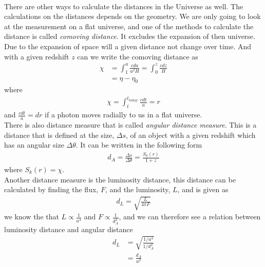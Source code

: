 \documentclass{aa}
\begin{document}
\\
There are other ways to calculate the distances in the Universe as well. The calculations on the distances depends on the geometry.
 We are only going to look at the measurement on a flat universe, and one of the methods to calculate the distance is called \emph{comoving distance}. It excludes the expansion of then universe. Due to the expansion of space will a given distance not change over time. And with a given redshift $z$ can we write the comoving distance as
\begin{align}
    \chi &=\int_1^a\frac{cda}{a^2H}=\int_0^z\frac{cdz}{H}\\
    &=\eta-\eta_0
\end{align}
where
\begin{align}
    \chi=\int_t^{t_\text{today}}\frac{cdt}{a}=r
\end{align}
and $\frac{cdt}{a}=dr$ if a photon moves radially to us in a flat universe.
\\
There is also distance measure that is called \emph{angular distance measure}. This is a distance that is defined at the size, $\Delta s$, of an object with a given redshift which has an angular size $\Delta \theta$. It can be written in the following form
\begin{align}
    d_A=\frac{\Delta s}{\Delta \theta}=\frac{S_k(r)}{1+z}
\end{align}
where $S_k(r)=\chi$.\\
Another distance measure is the luminosity distance, this distance can be calculated by finding the flux, $F$, and the luminosity, $L$, and is given as
\begin{align}
    d_L=\sqrt{\frac{L}{4\pi F}}
\end{align}
we know the that $L\propto \frac{1}{a^4}$ and $F\propto\frac{1}{d_A^2}$, and we can therefore see a relation between luminosity distance and angular distance 
\begin{align}
    d_L&=\sqrt{\frac{1/a^4}{1/d_A^2}}\\
    &=\frac{d_A}{a^2}
\end{align}
\end{document}
